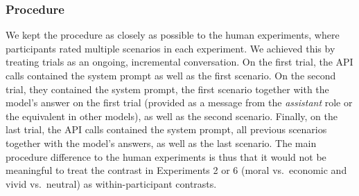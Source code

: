\documentclass[
]{article}
\begin{document}
\subsubsection{Procedure}\label{procedure}

We kept the procedure as closely as possible to the human experiments, where participants rated multiple scenarios in each experiment. We achieved this by treating trials as an ongoing, incremental conversation. On the first trial, the API calls contained the system prompt as well as the first scenario. On the second trial, they contained the system prompt, the first scenario together with the model's answer on the first trial (provided as a message from the \emph{assistant} role or the equivalent in other models), as well as the second scenario. Finally, on the last trial, the API calls contained the system prompt, all previous scenarios together with the model's answers, as well as the last scenario. The main procedure difference to the human experiments is thus that it would not be meaningful to treat the contrast in Experiments 2 or 6 (moral vs.~economic and vivid vs.~neutral) as within-participant contrasts.
\end{document}

